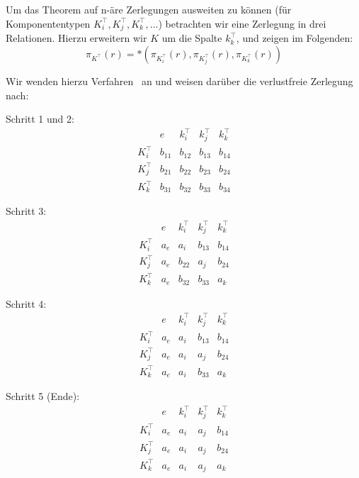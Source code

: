 \bigskip
\noindent
Um das Theorem auf n-äre Zerlegungen ausweiten zu können (für Komponententypen $K^{\top}_i, K^{\top}_j, K^{\top}_k, \ldots$) betrachten wir eine Zerlegung in drei Relationen.
Hierzu erweitern wir $K$ um die Spalte $k^{\top}_k$, und zeigen im Folgenden:
\[
    \pi_{K^{\top}}(r) = *(\pi_{K^{\top}_i}(r), \pi_{K^{\top}_j}(r), \pi_{K^{\top}_k}(r))
\]

\noindent
Wir wenden hierzu Verfahren~\cite[Algorithmus 10.2, S. 342]{EN11} an und weisen darüber die verlustfreie Zerlegung nach:

\bigskip
Schritt 1 und 2:
\[
    \begin{array}{c|cccc}
        & e & k^{\top}_i & k^{\top}_j & k^{\top}_k \\
        \hline
        K^{\top}_i     & b_{11} & b_{12} & b_{13} & b_{14} \\
        K^{\top}_j     & b_{21} & b_{22} & b_{23} & b_{24} \\
        K^{\top}_k     & b_{31} & b_{32} & b_{33} & b_{34}
    \end{array}
\]

\medskip
Schritt 3:
\[
    \begin{array}{c|cccc}
        & e & k^{\top}_i & k^{\top}_j & k^{\top}_k \\
        \hline
        K^{\top}_i     & a_e & a_i & b_{13} & b_{14} \\
        K^{\top}_j     & a_e & b_{22} & a_j & b_{24} \\
        K^{\top}_k     & a_e & b_{32} & b_{33} & a_k
    \end{array}
\]

\medskip
Schritt 4:
\[
    \begin{array}{c|cccc}
        & e & k^{\top}_i & k^{\top}_j & k^{\top}_k \\
        \hline
        K^{\top}_i     & a_e & a_i & b_{13} & b_{14} \\
        K^{\top}_j     & a_e & a_i & a_j & b_{24} \\
        K^{\top}_k     & a_e & a_i & b_{33} & a_k
    \end{array}
\]

\medskip
Schritt 5 (Ende):
\[
    \begin{array}{c|cccc}
        & e & k^{\top}_i & k^{\top}_j & k^{\top}_k \\
        \hline
        K^{\top}_i     & a_e & a_i & a_j & b_{14} \\
        K^{\top}_j     & a_e & a_i & a_j & b_{24} \\
        K^{\top}_k     & a_e & a_i & a_j & a_k
    \end{array}
\]

